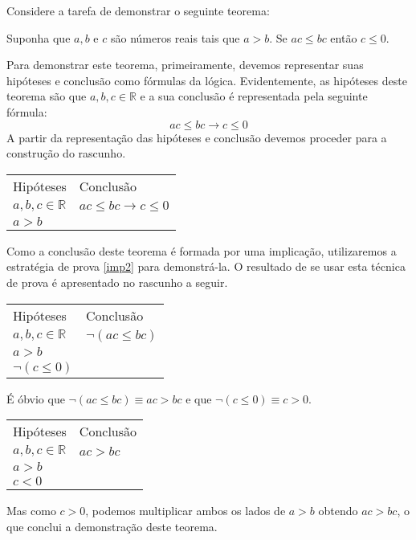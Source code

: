 \begin{Example}
Considere a tarefa de demonstrar o seguinte teorema:
\begin{flushleft}
Suponha que $a,b$ e $c$ são números reais tais que $a > b$. Se $ac
\leq bc$ então $c\leq 0$.
\end{flushleft}
Para demonstrar este teorema, primeiramente, devemos representar suas
hipóteses e conclusão como fórmulas da lógica. Evidentemente, as
hipóteses deste teorema são que $a,b,c\in\mathbb{R}$ e a sua conclusão
é representada pela seguinte fórmula:
\[
ac\leq bc \to c \leq 0
\]
A partir da representação das hipóteses e conclusão devemos proceder
para a construção do rascunho.
\begin{flushleft}
\begin{tabular}{ll}
Hipóteses & Conclusão \\
$a,b,c\in\mathbb{R}$ & $ ac\leq bc \to c \leq 0$\\
$a > b$ & \\
\end{tabular}
\end{flushleft}
Como a conclusão deste teorema é formada por uma implicação,
utilizaremos a estratégia de prova \ref{imp2} para demonstrá-la. O
resultado de se usar esta técnica de prova é apresentado no rascunho a
seguir.
\begin{flushleft}
\begin{tabular}{ll}
Hipóteses & Conclusão \\
$a,b,c\in\mathbb{R}$ & $ \neg (ac\leq bc)$\\
$a > b$ & \\
$\neg (c\leq 0)$ &
\end{tabular}
\end{flushleft}
É óbvio que $\neg (ac \leq bc) \equiv ac > bc$ e que $\neg (c \leq 0)
\equiv c > 0$.
\begin{flushleft}
\begin{tabular}{ll}
Hipóteses & Conclusão \\
$a,b,c\in\mathbb{R}$ & $ac > bc$\\
$a > b$ & \\
$c < 0$ &
\end{tabular}
\end{flushleft}
Mas como $c > 0$, podemos multiplicar ambos os lados de $a > b$
obtendo $ac > bc$, o que conclui a demonstração deste teorema.


\end{Example}
